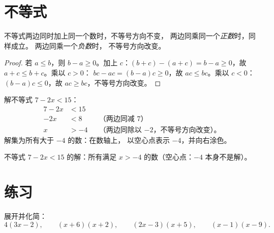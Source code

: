 \section{不等式}

\begin{proposition}[不等式的性质]\label{prop:g9:algebra:ineq}
不等式两边同时加上同一个数时，不等号方向不变，
两边同乘同一个\emph{正数}时，同样成立。
两边同乘一个\emph{负数}时，
不等号方向改变。
\end{proposition}

\begin{proof}
若 $a \leq b$，则 $b - a \geq 0$。加上 $c$：$(b+c) - (a+c) = b - a
\geq 0$，故 $a + c \leq b + c$。乘以 $c > 0$：
$bc - ac = (b-a)c \geq 0$，故 $ac \leq bc$。乘以 $c < 0$：
$(b-a)c \leq 0$，故 $ac \geq bc$，不等号方向改变。
\end{proof}

\begin{example}\label{ex:g9:algebra:ineq}
解不等式 $7 - 2x < 15$：
\begin{align*}
7 - 2x &< 15 \\
-2x &< 8 && \text{（两边同减 7）} \\
x &> -4 && \text{（两边同除以 $-2$，不等号方向改变）。}
\end{align*}
解集为所有大于 $-4$ 的数：在数轴上，
以空心点表示 $-4$，并向右涂色。
\end{example}

\begin{omfigure}

{\small 不等式 $7 - 2x < 15$ 的解：所有满足 $x > -4$ 的数（空心点：$-4$
本身不是解）。}
\end{omfigure}

\section{练习}

\begin{exercise}[$\star$]\label{exo:g9:algebra:1}
展开并化简：
\[
4(3x - 2), \qquad
(x + 6)(x + 2), \qquad
(2x - 3)(x + 5), \qquad
(x - 1)(x - 9).
\]
\end{exercise}

